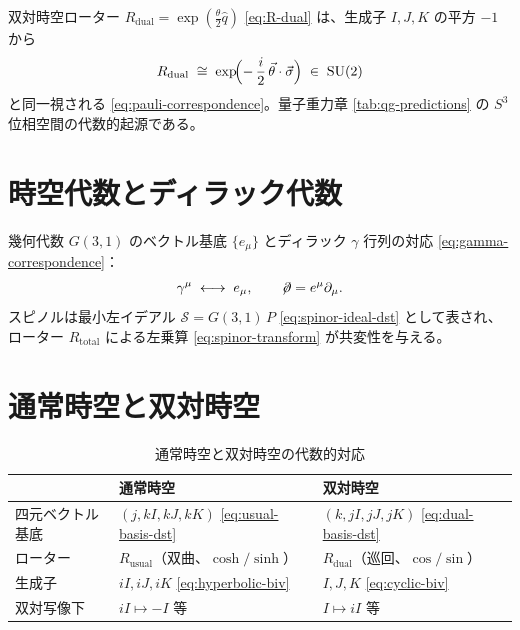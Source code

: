 \documentclass[dvipdfmx,a4paper,oneside]{jsbook}
\numberwithin{equation}{chapter}
\begin{document}
双対時空ローター \(R_{\mathrm{dual}} = \exp(\tfrac{\theta}{2}\hat{q})\) \eqref{eq:R-dual} は、生成子 \(I,J,K\) の平方 \(-1\) から
\begin{equation}
  R_{\mathrm{dual}} \;\cong\; \exp\!\Bigl(-\,\frac{i}{2}\,\vec\theta\cdot\vec\sigma\Bigr)
  \;\in\; \mathrm{SU}(2)
  \label{eq:app-SU2}
\end{equation}
と同一視される \eqref{eq:pauli-correspondence}。量子重力章 \eqref{tab:qg-predictions} の \(S^3\) 位相空間の代数的起源である。

\section{時空代数とディラック代数}

幾何代数 \(G(3,1)\) のベクトル基底 \(\{e_\mu\}\) とディラック \(\gamma\) 行列の対応 \eqref{eq:gamma-correspondence}：
\begin{equation}
  \gamma^\mu \;\longleftrightarrow\; e_\mu, \qquad
  \not\!\partial = e^\mu \partial_\mu.
  \label{eq:app-gamma}
\end{equation}
スピノルは最小左イデアル \(\mathcal{S} = G(3,1)\,P\) \eqref{eq:spinor-ideal-dst} として表され、ローター \(R_{\mathrm{total}}\) による左乗算 \eqref{eq:spinor-transform} が共変性を与える。

\section{通常時空と双対時空}

\begin{table}[htbp]
  \centering
  \caption{通常時空と双対時空の代数的対応}
  \label{tab:app-usual-dual}
  \begin{tabular}{@{}lll@{}}
    \toprule
    & 通常時空 & 双対時空 \\
    \midrule
    四元ベクトル基底 & \((j, kI, kJ, kK)\) \eqref{eq:usual-basis-dst} & \((k, jI, jJ, jK)\) \eqref{eq:dual-basis-dst} \\
    ローター & \(R_{\mathrm{usual}}\)（双曲、\(\cosh/\sinh\)） & \(R_{\mathrm{dual}}\)（巡回、\(\cos/\sin\)） \\
    生成子 & \(iI, iJ, iK\) \eqref{eq:hyperbolic-biv} & \(I, J, K\) \eqref{eq:cyclic-biv} \\
    双対写像下 & \(iI \mapsto -I\) 等 & \(I \mapsto iI\) 等 \\
    \bottomrule
  \end{tabular}
\end{table}
\end{document}
